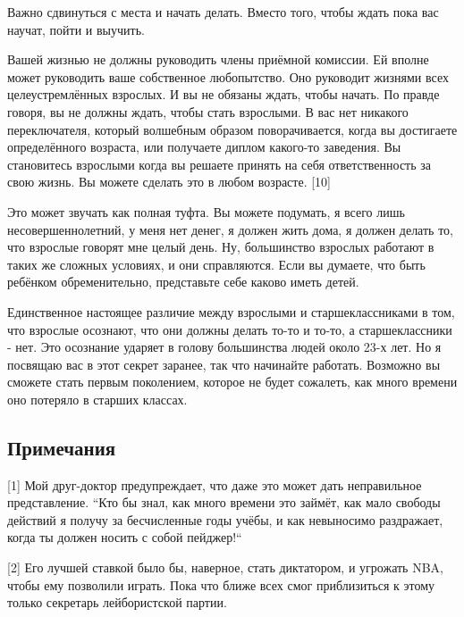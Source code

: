 \documentclass[ebook,12pt,oneside,openany]{memoir}
\begin{document}
Важно сдвинуться с места и начать делать. Вместо того, чтобы ждать
пока вас научат, пойти и выучить. \newline

Вашей жизнью не должны руководить члены приёмной комиссии. Ей вполне
может руководить ваше собственное любопытство. Оно руководит жизнями
всех целеустремлённых взрослых. И вы не обязаны ждать, чтобы начать.
По правде говоря, вы не должны ждать, чтобы стать взрослыми. В вас нет
никакого переключателя, который волшебным образом поворачивается,
когда вы достигаете определённого возраста, или получаете диплом
какого-то заведения. Вы становитесь взрослыми когда вы решаете принять
на себя ответственность за свою жизнь. Вы можете сделать это в любом
возрасте. [10] \newline

Это может звучать как полная туфта. Вы можете подумать, я всего лишь
несовершеннолетний, у меня нет денег, я должен жить дома, я должен
делать то, что взрослые говорят мне целый день. Ну, большинство
взрослых работают в таких же сложных условиях, и они справляются. Если
вы думаете, что быть ребёнком обременительно, представьте себе каково
иметь детей. \newline

Единственное настоящее различие между взрослыми и старшеклассниками в
том, что взрослые осознают, что они должны делать то-то и то-то, а
старшеклассники - нет. Это осознание ударяет в голову большинства
людей около 23-х лет. Но я посвящаю вас в этот секрет заранее, так что
начинайте работать. Возможно вы сможете стать первым поколением,
которое не будет сожалеть, как много времени оно потеряло в старших
классах. \newline

\subsection{Примечания}

[1] Мой друг-доктор предупреждает, что даже это может дать
неправильное представление. ``Кто бы знал, как много времени это
займёт, как мало свободы действий я получу за бесчисленные годы учёбы,
и как невыносимо раздражает, когда ты должен носить с собой пейджер!`` \newline

[2] Его лучшей ставкой было бы, наверное, стать диктатором, и угрожать
NBA, чтобы ему позволили играть. Пока что ближе всех смог приблизиться
к этому только секретарь лейбористской партии. \newline
\end{document}
